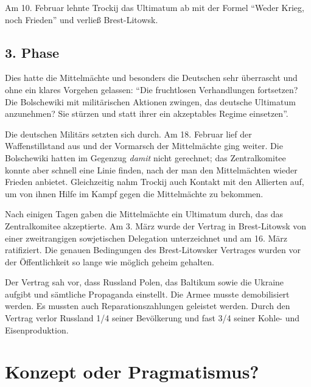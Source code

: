 \documentclass[12pt,headsepline,a4paper]{scrartcl}
\begin{document}
Am 10. Februar lehnte Trockij das Ultimatum ab mit der Formel "`Weder Krieg, noch Frieden"' und verließ Brest-Litowsk.

\subsection{3. Phase}
Dies hatte die Mittelmächte und besonders die Deutschen sehr überrascht und ohne ein klares Vorgehen gelassen: "`Die fruchtlosen Verhandlungen fortsetzen? Die Bolschewiki mit militärischen Aktionen zwingen, das deutsche Ultimatum anzunehmen? Sie stürzen und statt ihrer ein akzeptables Regime einsetzen"'\autocite[416]{pipes1992}.

Die deutschen Militärs setzten sich durch. Am 18. Februar lief der Waffenstillstand aus und der Vormarsch der Mittelmächte ging weiter. Die Bolschewiki hatten im Gegenzug \textit{damit} nicht gerechnet; das Zentralkomitee konnte aber schnell eine Linie finden, nach der man den Mittelmächten wieder Frieden anbietet. Gleichzeitig nahm Trockij auch Kontakt mit den Allierten auf, um von ihnen Hilfe im Kampf gegen die Mittelmächte zu bekommen.

Nach einigen Tagen gaben die Mittelmächte ein Ultimatum durch, das das Zentralkomitee akzeptierte. Am 3. März wurde der Vertrag in Brest-Litowsk von einer zweitrangigen sowjetischen Delegation unterzeichnet und am 16. März ratifiziert. Die genauen Bedingungen des Brest-Litowsker Vertrages wurden vor der Öffentlichkeit so lange wie möglich geheim gehalten.

Der Vertrag sah vor, dass Russland Polen, das Baltikum sowie die Ukraine aufgibt und sämtliche Propaganda einstellt. Die Armee musste demobilisiert werden. Es mussten auch Reparationszahlungen geleistet werden. Durch den Vertrag verlor Russland 1/4 seiner Bevölkerung und fast 3/4 seiner Kohle- und Eisenproduktion\autocite[89]{rauch1990}.

\newpage
\section{Konzept oder Pragmatismus?}
\end{document}
